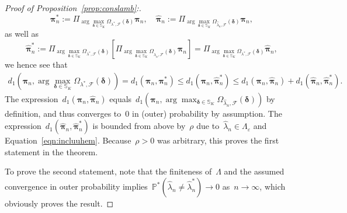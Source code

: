 \documentclass[11pt, a4paper]{article}
\theoremstyle{definition}
\begin{document}
\begin{proof}[Proof of Proposition~\ref{prop:conslamb}:]
$$\bm{\pi}_n^* := \Pi_{\arg\max_{\bm{\delta} \in \mathbb{S}_K} \Omega_{ \lambda^*, \mathcal{F}}(\bm{\delta})} \bm{\pi}_n, \quad \hat{\bm{\pi}}_n := \Pi_{\arg\max_{\bm{\delta} \in \mathbb{S}_K} \Omega_{ \hat{\lambda}_n, \mathcal{F}}(\bm{\delta})} \bm{\pi}_n,$$ as well as $$\hat{\bm{\pi}}_n^* := \Pi_{\arg\max_{\bm{\delta} \in \mathbb{S}_K} \Omega_{ \lambda^*, \mathcal{F}}(\bm{\delta})} \left[ \Pi_{\arg\max_{\bm{\delta} \in \mathbb{S}_K} \Omega_{ \hat{\lambda}_n, \mathcal{F}}(\bm{\delta})} \bm{\pi}_n\right] = \Pi_{\arg\max_{\bm{\delta} \in \mathbb{S}_K} \Omega_{ \lambda^*, \mathcal{F}}(\bm{\delta})} \hat{\bm{\pi}}_n,$$ we hence see that
%
\begin{align*}
d_1\left( \bm{\pi}_n, \arg\max_{\bm{\delta} \in \mathbb{S}_K} \Omega_{ \lambda^*, \mathcal{F}}(\bm{\delta}) \right) = d_1\left( \bm{\pi}_n, \bm{\pi}_n^* \right) \leq d_1\left( \bm{\pi}_n,  \hat{\bm{\pi}}_n^* \right) \leq d_1\left( \bm{\pi}_n, \hat{\bm{\pi}}_n  \right) + d_1\left( \hat{\bm{\pi}}_n , \hat{\bm{\pi}}_n^*  \right).
\end{align*}
%
The expression~$d_1( \bm{\pi}_n, \hat{\bm{\pi}}_n  )$ equals~$d_1( \bm{\pi}_n, \arg\max_{\bm{\delta} \in \mathbb{S}_K} \Omega_{  \hat{\lambda}_n, \mathcal{F}}(\bm{\delta}))$ by definition, and thus converges to~$0$ in (outer) probability by assumption. The expression~$d_1\left( \hat{\bm{\pi}}_n , \hat{\bm{\pi}}_n^*  \right)$ is bounded from above by~$\rho$ due to~$\hat{\lambda}_n \in \Lambda_{\varepsilon}$ and Equation~\eqref{eqn:incluuhem}. Because~$\rho > 0$ was arbitrary, this proves the first statement in the theorem.

To prove the second statement, note that the finiteness of~$\Lambda$ and the assumed convergence in outer probability implies~$\mathbb{P}^*(\hat{\lambda}_n \neq \hat{\lambda}_n^*) \to 0$ as~$n \to \infty$, which obviously proves the result.
\end{proof}
\end{document}
